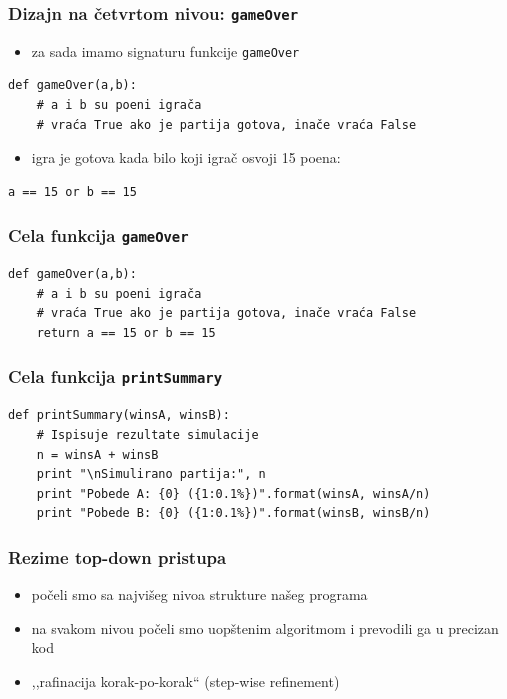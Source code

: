 \documentclass[utf8,compress]{beamer}
\begin{document}
\begin{frame}[fragile]
  \frametitle{Dizajn na četvrtom nivou: \texttt{gameOver}}
\begin{itemize}
  \item za sada imamo signaturu funkcije \texttt{gameOver}
\end{itemize}
\begin{verbatim}
def gameOver(a,b):
    # a i b su poeni igrača
    # vraća True ako je partija gotova, inače vraća False
\end{verbatim}
\begin{itemize}
  \item igra je gotova kada bilo koji igrač osvoji 15 poena:
\end{itemize}
\begin{verbatim}
a == 15 or b == 15
\end{verbatim}
\end{frame}

\begin{frame}[fragile]
  \frametitle{Cela funkcija \texttt{gameOver}}
\begin{verbatim}
def gameOver(a,b):
    # a i b su poeni igrača
    # vraća True ako je partija gotova, inače vraća False
    return a == 15 or b == 15
\end{verbatim}
\end{frame}

\begin{frame}[fragile]
  \frametitle{Cela funkcija \texttt{printSummary}}
\begin{verbatim}
def printSummary(winsA, winsB):
    # Ispisuje rezultate simulacije
    n = winsA + winsB
    print "\nSimulirano partija:", n
    print "Pobede A: {0} ({1:0.1%})".format(winsA, winsA/n)
    print "Pobede B: {0} ({1:0.1%})".format(winsB, winsB/n)
\end{verbatim}
\end{frame}

\begin{frame}
  \frametitle{Rezime top-down pristupa}
\begin{itemize}
  \item počeli smo sa najvišeg nivoa strukture našeg programa
  \item na svakom nivou počeli smo uopštenim algoritmom i prevodili ga u precizan kod
  \item ,,rafinacija korak-po-korak`` (step-wise refinement)
\end{itemize}
\end{frame}
\end{document}
